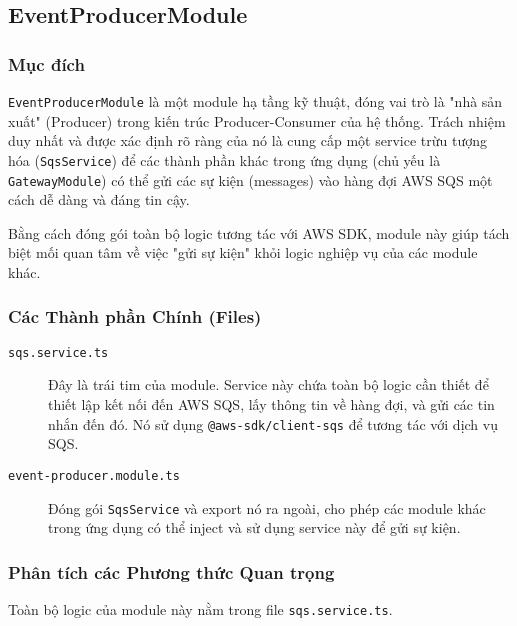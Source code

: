 \subsection{EventProducerModule}
\label{subsec:eventproducer-module}

\subsubsection{Mục đích}

\texttt{EventProducerModule} là một module hạ tầng kỹ thuật, đóng vai trò là "nhà sản xuất" (Producer) trong kiến trúc Producer-Consumer của hệ thống. Trách nhiệm duy nhất và được xác định rõ ràng của nó là cung cấp một service trừu tượng hóa (\texttt{SqsService}) để các thành phần khác trong ứng dụng (chủ yếu là \texttt{GatewayModule}) có thể gửi các sự kiện (messages) vào hàng đợi AWS SQS một cách dễ dàng và đáng tin cậy.

Bằng cách đóng gói toàn bộ logic tương tác với AWS SDK, module này giúp tách biệt mối quan tâm về việc "gửi sự kiện" khỏi logic nghiệp vụ của các module khác.

\subsubsection{Các Thành phần Chính (Files)}

\begin{description}
    \item[\texttt{sqs.service.ts}] Đây là trái tim của module. Service này chứa toàn bộ logic cần thiết để thiết lập kết nối đến AWS SQS, lấy thông tin về hàng đợi, và gửi các tin nhắn đến đó. Nó sử dụng \texttt{@aws-sdk/client-sqs} để tương tác với dịch vụ SQS.
    
    \item[\texttt{event-producer.module.ts}] Đóng gói \texttt{SqsService} và export nó ra ngoài, cho phép các module khác trong ứng dụng có thể inject và sử dụng service này để gửi sự kiện.
\end{description}

\subsubsection{Phân tích các Phương thức Quan trọng}

Toàn bộ logic của module này nằm trong file \texttt{sqs.service.ts}.

